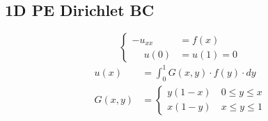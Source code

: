 \vspace{0.5em}
\subsection{1D PE \texorpdfstring{\hfill}{-} Dirichlet BC}
    \vspace{-0.5em}
    $$
        \begin{cases}
            -u_{xx} &= f(x)\\
            \phantom{-}u(0) &= u(1) = 0
        \end{cases}
    $$
    \begin{align*}
        u(x) &= \int_0^1 G(x,y) \cdot f(y) \cdot dy\\
        G(x,y) &=
        \begin{cases}
            y(1-x)\quad 0 \leq y \leq x\\
            x(1-y)\quad x \leq y \leq 1
        \end{cases}
    \end{align*}